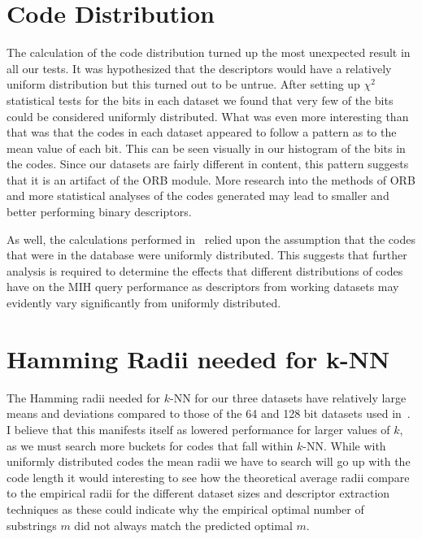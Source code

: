 \section{Code Distribution}
The calculation of the code distribution turned up the most unexpected result in all our tests. It was hypothesized that the descriptors would have a relatively uniform distribution but this turned out to be untrue. After setting up $\chi^2$ statistical tests for the bits in each dataset we found that very few of the bits could be considered uniformly distributed. What was even more interesting than that was that the codes in each dataset appeared to follow a pattern as to the mean value of each bit. This can be seen visually in our histogram of the bits in the codes. Since our datasets are fairly different in content, this pattern suggests that it is an artifact of the ORB module. More research into the methods of ORB and more statistical analyses of the codes generated may lead to smaller and better performing binary descriptors.

As well, the calculations performed in~\cite{norouzi2012fast} relied upon the assumption that the codes that were in the database were uniformly distributed. This suggests that further analysis is required to determine the effects that different distributions of codes have on the MIH query performance as descriptors from working datasets may evidently vary significantly from uniformly distributed.

\section{Hamming Radii needed for k-NN}
The Hamming radii needed for $k$-NN for our three datasets have relatively large means and deviations compared to those of the 64 and 128 bit datasets used in~\cite{norouzi2012fast}. I believe that this manifests itself as lowered performance for larger values of $k$, as we must search more buckets for codes that fall within $k$-NN. While with uniformly distributed codes the mean radii we have to search will go up with the code length it would interesting to see how the theoretical average radii compare to the empirical radii for the different dataset sizes and descriptor extraction techniques as these could indicate why the empirical optimal number of substrings $m$ did not always match the predicted optimal $m$.
